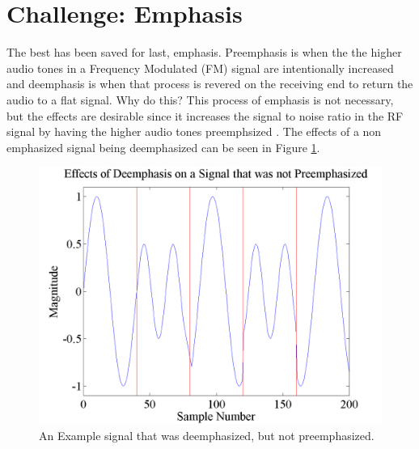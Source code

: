 
\section{Challenge: Emphasis}
The best has been saved for last, emphasis. Preemphasis is when the the higher audio tones in a Frequency Modulated (FM) signal are intentionally increased and deemphasis is when that process is revered on the receiving end to return the audio to a flat signal. Why do this? This process of emphasis is not necessary, but the effects are desirable since it increases the signal to noise ratio in the RF signal by having the higher audio tones preemphsized \cite{Gibilisco1994}. The effects of a non emphasized signal being deemphasized can be seen in Figure \ref{emphasisExample}.
\begin{figure}
  \centering
	\includegraphics[width=0.75\linewidth]{images/EffectsofDeemphasisonaSignalthatwasnotpreemphasized.png} 
	\caption{An Example signal that was deemphasized, but not preemphasized.}
   \label{emphasisExample}
\end{figure}
